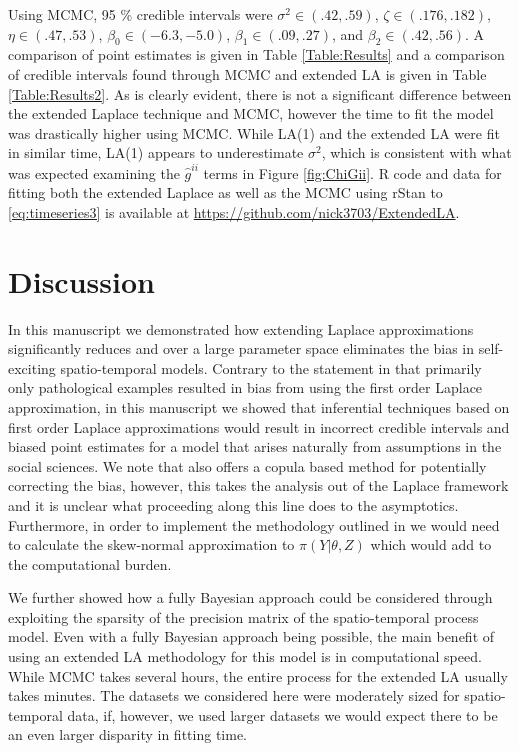 \documentclass[11pt]{isuthesis}
\begin{document}
	Using MCMC, 95 \% credible intervals were $\sigma^2 \in (.42,.59)$, $\zeta \in (.176,.182)$, $\eta \in (.47,.53)$, $\beta_0 \in (-6.3,-5.0)$, $\beta_1 \in (.09,.27)$, and $\beta_2 \in (.42,.56)$.  A comparison of point estimates is given in Table \ref{Table:Results} and a comparison of credible intervals found through MCMC and extended LA is given in Table \ref{Table:Results2}.  As is clearly evident, there is not a significant difference between the extended Laplace technique and MCMC, however the time to fit the model was drastically higher using MCMC.  While LA(1) and the extended LA were fit in similar time, LA(1) appears to underestimate $\sigma^2$, which is consistent with what was expected examining the $\hat{g}^{ii}$ terms in Figure \ref{fig:ChiGii}.  R code and data for fitting both the extended Laplace as well as the MCMC using rStan to \ref{eq:timeseries3} is available at \href{https://github.com/nick3703/ExtendedLA}{https://github.com/nick3703/ExtendedLA}.

	\section{Discussion}
	In this manuscript we demonstrated how extending Laplace approximations significantly reduces and over a large parameter space eliminates the bias in self-exciting spatio-temporal models.  Contrary to the statement in \cite{rue2009approximate} that primarily only pathological examples resulted in bias from using the first order Laplace approximation, in this manuscript we showed that inferential techniques based on first order Laplace approximations would result in incorrect credible intervals and biased point estimates for  a model that arises naturally from assumptions in the social sciences.  We note that \cite{ferkingstad2015improving} also offers a copula based method for potentially correcting the bias, however, this takes the analysis out of the Laplace framework and it is unclear what proceeding along this line does to the asymptotics. Furthermore, in order to implement the methodology outlined in \cite{ferkingstad2015improving} we would need to calculate the skew-normal approximation to $\pi(Y|\theta,Z)$ which would add to the computational burden.
	
	We further showed how a fully Bayesian approach could be considered through exploiting the sparsity of the precision matrix of the spatio-temporal process model.  Even with a fully Bayesian approach being possible, the main benefit of using an extended LA methodology for this model is in computational speed.  While MCMC takes several hours, the entire process for the extended LA usually takes minutes.  The datasets we considered here were moderately sized for spatio-temporal data, if, however, we used larger datasets we would expect there to be an even larger disparity in fitting time.
	
\end{document}
